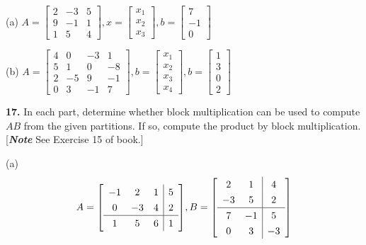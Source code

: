 \documentclass[addpoints]{exam}
\begin{document}
\begin{sloppypar}
\begin{questions}
\begin{solution}
        (a)
        $ A = \begin{bmatrix}
            2 & -3 & 5 \\ 
            9 & -1 & 1 \\ 
            1 & 5 & 4
        \end{bmatrix}, x = \begin{bmatrix}
            x_1 \\ x_2 \\ x_3
        \end{bmatrix}, b = \begin{bmatrix}
            7 \\ -1 \\ 0
        \end{bmatrix} $

        (b) $ A = \begin{bmatrix}
            4 & 0 & -3 & 1 \\ 
            5 & 1 & 0 & -8 \\ 
            2 & -5 & 9 & -1 \\ 
            0 & 3 & -1 & 7
        \end{bmatrix}, b = \begin{bmatrix}
            x_1 \\ x_2 \\ x_3 \\ x_4
        \end{bmatrix}, b = \begin{bmatrix}
            1 \\ 3 \\ 0 \\ 2
        \end{bmatrix} $
    \end{solution}

    \question
    \textbf{17. } In each part, determine whether block multiplication can be used to compute $AB$ from the given partitions. If so, compute the product by block multiplication. [\textbf{\textit{Note}} See Exercise 15 of book.]


    (a) \[ A = \renewcommand\arraystretch{1.3}
    \mleft[ 
    \begin{array}{ccc|c}
        -1 & 2 & 1 & 5 \\ 
        0 & -3 & 4 & 2 \\ 
        \hline
        1 & 5 & 6 & 1
    \end{array}
    \mright], B = \renewcommand\arraystretch{1.3}
    \mleft[
    \begin{array}{cc|c}
        2 & 1 & 4 \\ 
        -3 & 5 & 2 \\ 
        \hline 
        7 & -1 & 5 \\ 
        0 & 3 & -3
    \end{array}
    \mright] \]
    

\end{questions}
\end{sloppypar}
\end{document}
